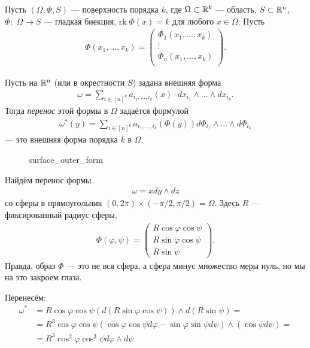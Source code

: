 \begin{df}
 Пусть $(\Omega, \Phi, S)$ --- поверхность порядка $k$, где $\Omega \subset \mathbb{R}^{k}$ --- область, $S \subset \mathbb{R}^{n}$, $\Phi \colon\; \Omega \to S$ --- гладкая биекция, $\mathrm{rk}\;\Phi(x) = k$ для любого $x \in \Omega$. Пусть
 \begin{align*}
  \Phi(x_1, \ldots, x_k) = \begin{pmatrix}
   \Phi_1(x_1, \ldots, x_k) \\
   \vdots \\
   \Phi_n(x_1, \ldots, x_k) \\
  \end{pmatrix}
 .\end{align*} 

 Пусть на $\mathbb{R}^{n}$ (или в окрестности $S$) задана внешняя форма
 \begin{align*}
  \omega = \sum_{i \in [n]^{k}} a_{i_1,\ldots,i_k}(x) \cdot dx_{i_1} \land \ldots \land dx_{i_k}
 .\end{align*} Тогда \textit{перенос} этой формы в $\Omega$ задаётся формулой
 \begin{align*}
  \omega^{\ast}(y) = \sum_{i \in [n]^{k}} a_{i_1,\ldots,i_k} (\Phi(y)) d\Phi_{i_1} \land \ldots \land d \Phi_{i_k}
 \end{align*}  --- это внешняя форма порядка $k$ в $\Omega$.
\end{df}
\begin{figure}[ht]
    \centering
    \caption{surface_outer_form}
    \label{fig:surface_outer_form}
\end{figure}
\begin{exmpl}
 Найдём перенос формы
 \begin{align*}
  \omega = x dy \land dz
 \end{align*} со сферы в прямоугольник $(0, 2\pi) \times (-\pi / 2, \pi / 2) = \Omega$. Здесь $R$ --- фиксированный радиус сферы,
 \begin{align*}
  \Phi(\varphi, \psi) = \begin{pmatrix}
   R \cos \varphi \cos \psi \\
   R \sin \varphi \cos \psi \\
   R \sin \psi
  \end{pmatrix}
 .\end{align*} Правда, образ $\Phi$ --- это не вся сфера, а сфера минус множество меры нуль, но мы на это закроем глаза.

 Перенесём:
 \begin{align*}
  \omega^{\ast} &= R \cos \varphi \cos \psi (d (R \sin \varphi \cos \psi)) \land d(R \sin \psi) = \\
  &= R^{3} \cos\varphi \cos\psi (\cos\varphi \cos \psi d\varphi - \sin\varphi\sin\psi d\psi) \land (\cos\psi d \psi) = \\
  &= R^{3} \cos^{2}\varphi\cos^{3}\psi d\varphi \land d\psi
 .\end{align*} 
\end{exmpl}

